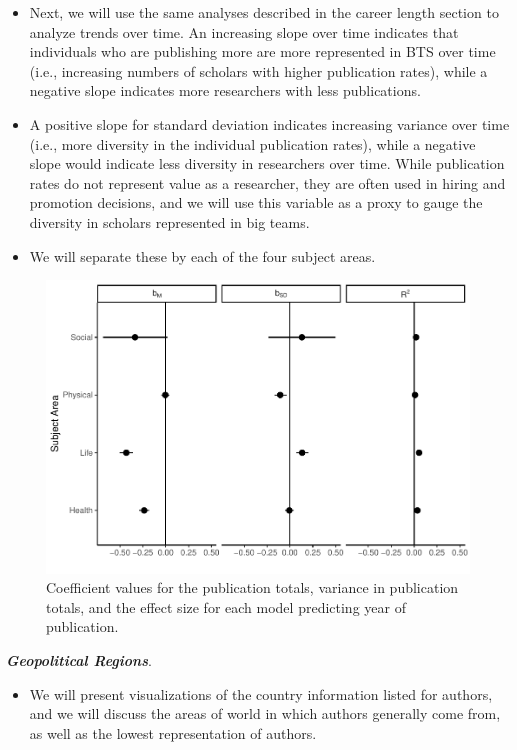 \documentclass[
  man]{apa7}
\providecommand{\tightlist}{%
  \setlength{\itemsep}{0pt}\setlength{\parskip}{0pt}}
\begin{document}
\begin{itemize}
\tightlist
\item
  Next, we will use the same analyses described in the career length
  section to analyze trends over time. An increasing slope over time
  indicates that individuals who are publishing more are more
  represented in BTS over time (i.e., increasing numbers of scholars
  with higher publication rates), while a negative slope indicates
  more researchers with less publications.
\item
  A positive slope for standard deviation indicates increasing
  variance over time (i.e., more diversity in the individual
  publication rates), while a negative slope would indicate less
  diversity in researchers over time. While publication rates do not
  represent value as a researcher, they are often used in hiring and
  promotion decisions, and we will use this variable as a proxy to
  gauge the diversity in scholars represented in big teams.
\item
  We will separate these by each of the four subject areas.
\end{itemize}

\begin{figure}
\centering
\includegraphics{manuscript_scopus_files/figure-latex/fig-pub-results-1.pdf}
\caption{\label{fig:fig-pub-results}Coefficient values for the publication totals, variance in publication totals, and the effect size for each model predicting year of publication.}
\end{figure}

\textbf{\emph{Geopolitical Regions}}.

\begin{itemize}
\tightlist
\item
  We will present visualizations of the country information listed for
  authors, and we will discuss the areas of world in which authors
  generally come from, as well as the lowest representation of
  authors.
\end{itemize}
\end{document}
